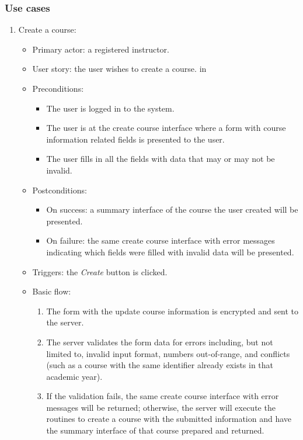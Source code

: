 \subsubsection{Use cases}
\begin{enumerate}
\item Create a course:
\begin{itemize}
    \item Primary actor: a registered instructor.
    \item User story: the user wishes to create a course.
     in
    \item Preconditions: 
        \begin{itemize}
            \item The user is logged in to the system.
            \item The user is at the create course interface where a form with
                course information related fields is presented to the user.
            \item The user fills in all the fields with data that may or
                may not be invalid.
        \end{itemize}
    \item Postconditions:
        \begin{itemize}
            \item On success: a summary interface of the course the user created
                will be presented.
            \item On failure: the same create course interface with error
                messages indicating which fields were filled with invalid data
                will be presented.
        \end{itemize}
    \item Triggers: the \emph{Create} button is clicked.
    \item Basic flow:
        \begin{enumerate}
            \item The form with the update course information is encrypted and
                sent to the server.
            \item The server validates the form data for errors including,
                but not limited to, invalid input format, numbers out-of-range,
                and conflicts (such as a course with the same identifier  
                already exists in that academic year).
            \item If the validation fails, the same create course interface
                with error messages will be returned; otherwise, the server will
                execute the routines to create a course with the submitted 
                information and have the summary interface of that course prepared
                and returned.
        \end{enumerate}
\end{itemize}


\end{enumerate}
